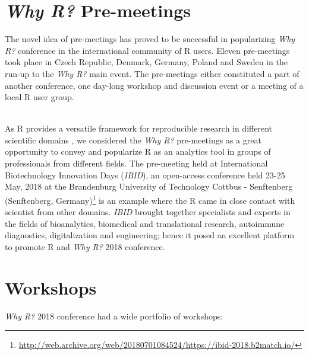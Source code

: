 \section{\emph{Why R?} Pre-meetings}

The novel idea of pre-meetings has proved to be successful in popularizing \emph{Why R?} conference in the international community of R users. Eleven pre-meetings took place in Czech Republic, Denmark, Germany, Poland and Sweden in the run-up to the \emph{Why R?} main event. 
The pre-meetings either constituted a part of another conference, one day-long workshop and discussion event or a meeting of a local R user group. 

~\\ As  R provides a versatile framework for reproducible research in different scientific domains \citep{gentleman_statistical_2007,gandrud_reproducible_2013,leeper_archiving_2014,liu_r_2014,rodiger_r_2015}, we considered the \emph{Why R?} pre-meetings as a great opportunity to convey and popularize R as an analytics tool in groups of professionals from different fields. The pre-meeting held at International Biotechnology Innovation Days (\emph{IBID}), an open-access conference held 23-25 May, 2018 at the Brandenburg University of Technology Cottbus - Senftenberg (Senftenberg, Germany)\footnote{\url{http://web.archive.org/web/20180701084524/https://ibid-2018.b2match.io/}} is an example where the R came in close contact with scientist from other domains. \emph{IBID} brought together specialists and experts in the fields of bioanalytics, biomedical and translational research, autoimmune diagnostics, digitalization and engineering; hence it posed an excellent platform to promote R and \emph{Why R?} 2018 conference.  

\section{Workshops}

\emph{Why R?} 2018 conference had a wide portfolio of workshops:


